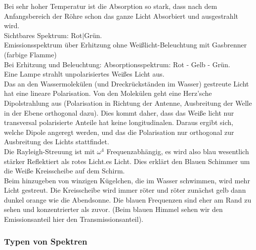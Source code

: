 Bei sehr hoher Temperatur ist die Absorption so stark, dass nach dem Anfangsbereich der Röhre schon das ganze Licht Absorbiert und ausgestrahlt wird.\\[5pt]
Sichtbares Spektrum: Rot$ | $Grün.\\
Emissionsspektrum über Erhitzung ohne Weißlicht-Beleuchtung mit Gasbrenner (farbige Flamme)\\
Bei Erhitzung und Beleuchtung: Absorptionsspektrum: Rot - Gelb - Grün.\\[5pt]
Eine Lampe strahlt unpolarisiertes Weißes Licht aus.\\
Das an den Wassermolekülen (und Dreckrückständen im Wasser) gestreute Licht hat eine lineare Polarisation. Von den Molekülen geht eine Herz'sche Dipolstrahlung aus (Polarisation in Richtung der Antenne, Ausbreitung der Welle in der Ebene orthogonal dazu). Dies kommt daher, dass das Weiße licht nur transversal polarisierte Anteile hat keine longitudinalen. Daraus ergibt sich, welche Dipole angeregt werden, und das die Polarisation nur orthogonal zur Ausbreitung des Lichts stattfindet.\\
Die Rayleigh-Streuung ist mit $ \omega^4 $ Frequenzabhängig, es wird also blau wesentlich stärker Reflektiert als rotes Licht.es Licht. Dies erklärt den Blauen Schimmer um die Weiße Kreisscheibe auf dem Schirm.\\
Beim hinzugeben von winzigen Kügelchen, die im Wasser schwimmen, wird mehr Licht gestreut. Die Kreisscheibe wird immer röter und röter zunächst gelb dann dunkel orange wie die Abendsonne. Die blauen Frequenzen sind eher am Rand zu sehen und konzentrierter als zuvor. (Beim blauen Himmel sehen wir den Emissionsanteil hier den Transmissionsanteil).\\[5pt]

\subsubsection{Typen von Spektren}

